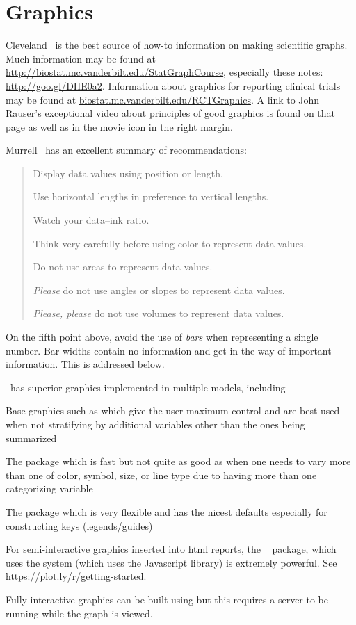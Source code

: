 \section{Graphics} \label{sec:graphics}
Cleveland~\cite{cle94ele,cle84sci} is the best source of how-to
information on making scientific graphs.  Much information may be
found at \url{http://biostat.mc.vanderbilt.edu/StatGraphCourse},
especially these notes: \url{http://goo.gl/DHE0a2}.  Information about
graphics for reporting clinical trials may be found at
\href{http://biostat.mc.vanderbilt.edu/RCTGraphics}{biostat.mc.vanderbilt.edu/RCTGraphics}.  
A link to John Rauser's exceptional video about principles of good graphics
is found on that page as well as in the movie icon in the right margin.


Murrell~\cite{mur13inf} has an excellent summary of recommendations:
\begin{quote}
\bi
\item Display data values using position or length.
\item Use horizontal lengths in preference to vertical lengths.
\item Watch your data--ink ratio.
\item Think very carefully before using color to represent data
  values.
\item Do not use areas to represent data values.
\item \emph{Please} do not use angles or slopes to represent data
  values.
\item \emph{Please, please} do not use volumes to represent data
  values.
\ei
\end{quote}

On the fifth point above, avoid the use of \emph{bars} when
representing a single number.  Bar widths contain no information and
get in the way of important information.  This is addressed below.

\R\ has superior graphics implemented in multiple models, including
\bi
\item Base graphics such as 
  which give the user maximum control and are best used when not
  stratifying by additional variables other than the ones being summarized
\item The  package which is fast but not quite as good as
   when one needs to vary more than one of color, symbol,
  size, or line type due to having more than one categorizing variable
\item The  package which is very flexible and has the
  nicest defaults especially for constructing keys (legends/guides)
\item For semi-interactive graphics inserted into html reports, the
  \R\  package, which uses the  system
  (which uses the Javascript  library) is extremely powerful.
  See \url{https://plot.ly/r/getting-started}. 
\item Fully interactive graphics can be built using  but
  this requires a server to be running while the graph is viewed.
\ei

